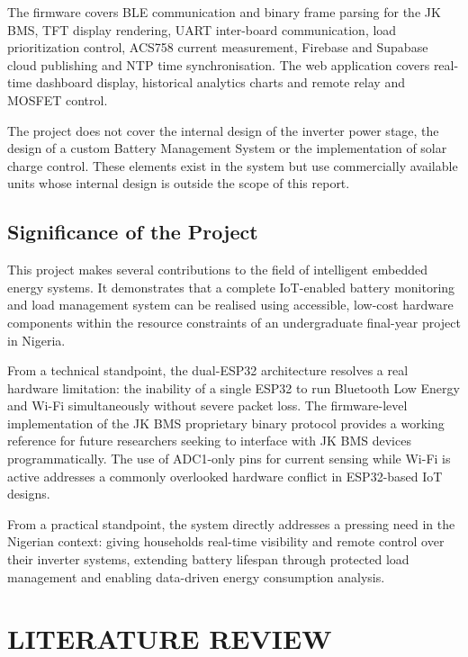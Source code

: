 \documentclass[12pt, a4paper]{report}
\begin{document}
The firmware covers BLE communication and binary frame parsing for the
JK BMS, TFT display rendering, UART inter-board communication, load
prioritization control, ACS758 current measurement, Firebase and Supabase
cloud publishing and NTP time synchronisation. The web application covers
real-time dashboard display, historical analytics charts and remote relay
and MOSFET control.

The project does not cover the internal design of the inverter power stage,
the design of a custom Battery Management System or the implementation of
solar charge control. These elements exist in the system but use
commercially available units whose internal design is outside the scope
of this report.

\section{Significance of the Project}

This project makes several contributions to the field of intelligent
embedded energy systems. It demonstrates that a complete IoT-enabled
battery monitoring and load management system can be realised using
accessible, low-cost hardware components within the resource constraints
of an undergraduate final-year project in Nigeria.

From a technical standpoint, the dual-ESP32 architecture resolves a
real hardware limitation: the inability of a single ESP32 to run
Bluetooth Low Energy and Wi-Fi simultaneously without severe packet loss.
The firmware-level implementation of the JK BMS proprietary binary
protocol provides a working reference for future researchers seeking to
interface with JK BMS devices programmatically. The use of ADC1-only
pins for current sensing while Wi-Fi is active addresses a commonly
overlooked hardware conflict in ESP32-based IoT designs.

From a practical standpoint, the system directly addresses a pressing
need in the Nigerian context: giving households real-time visibility and
remote control over their inverter systems, extending battery lifespan
through protected load management and enabling data-driven energy
consumption analysis.

\newpage
\chapter{LITERATURE REVIEW}
\end{document}
